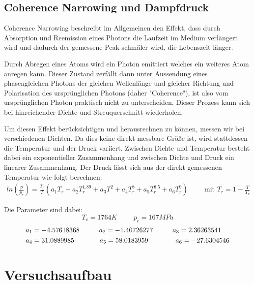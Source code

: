 \documentclass[12pt]{article}
\begin{document}
\subsection{Coherence Narrowing und Dampfdruck \label{Coherence}}

Coherence Narrowing beschreibt im Allgemeinen den Effekt, dass durch Absorption und Reemission eines Photons die Laufzeit im Medium verlängert wird und dadurch der gemessene Peak schmäler wird, die Lebenszeit länger.

Durch Abregen eines Atoms wird ein Photon emittiert welches ein weiteres Atom anregen kann. Dieser Zustand zerfällt dann unter Aussendung eines phasengleichen Photons der gleichen Wellenlänge und gleicher Richtung und Polarisation des ursprünglichen Photons (daher "Coherence"), ist also vom ursprünglichen Photon praktisch nicht zu unterscheiden. Dieser Prozess kann sich bei hinreichender Dichte und Streuquerschnitt wiederholen.

Um diesen Effekt berücksichtigen und herausrechnen zu können, messen wir bei verschiedenen Dichten. Da dies keine direkt messbare Größe ist, wird stattdessen die Temperatur und der Druck variiert. Zwischen Dichte und Temperatur besteht dabei ein exponentieller Zusammenhang und zwischen Dichte und Druck ein linearer Zusammenhang. Der Druck lässt sich aus der direkt gemessenen Temperatur wie folgt berechnen:
\begin{align}
ln\left( \frac{p}{p_c}\right) =\frac{T_c}{T}(a_1T_r + a_2T_r^{1.89} + a_3T^{2} + a_4T_r^{8} + a_5T_r^{8.5} + a_6T_r^{9})\hspace{1cm}\mbox{mit } T_r=1-\frac{T}{T_c} \label{Tp}
\end{align}

Die Parameter sind dabei:
\[T_c=1764K\hspace{1cm} p_c=167MPa\]
\begin{align*}
a_1&=-4.57618368\hspace{1cm} a_2=-1.40726277\hspace{1cm} a_3=2.36263541\\
a_4&=31.0889985\hspace{1.3cm} a_5=58.0183959\hspace{1.4cm} a_6=-27.6304546
\end{align*}





\newpage
\section{Versuchsaufbau}
\end{document}
